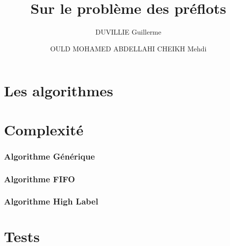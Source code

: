 

\author{DUVILLIE Guillerme \and OULD MOHAMED ABDELLAHI CHEIKH Mehdi}
\title{Sur le problème des préflots}



\maketitle
\newpage

\tableofcontents
\newpage



\part{Les algorithmes}


\part{Complexité}
\section{Algorithme Générique}


\section{Algorithme FIFO}


\section{Algorithme High Label}


\part{Tests}


\newpage




